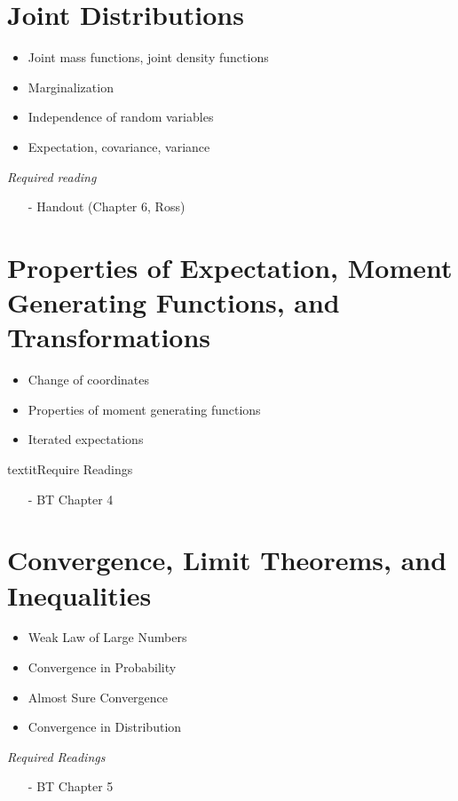 \documentclass{article}
\begin{document}
\section{Joint Distributions} 
\begin{itemize}
\item Joint mass functions, joint density functions
\item Marginalization
\item Independence of random variables
\item Expectation, covariance, variance
\end{itemize}
\textit{Required reading}
\begin{itemize}
\item[-] Handout (Chapter 6, Ross)
\end{itemize}

\section{Properties of Expectation, Moment Generating Functions, and Transformations}

\begin{itemize}
\item Change of coordinates
\item Properties of moment generating functions
\item Iterated expectations
\end{itemize}
textit{Require Readings}
\begin{itemize}
\item[-] BT Chapter 4
\end{itemize}






\section{Convergence, Limit Theorems, and Inequalities}

\begin{itemize}
\item Weak Law of Large Numbers
\item Convergence in Probability
\item Almost Sure Convergence
\item Convergence in Distribution
\end{itemize}
\textit{Required Readings}
\begin{itemize}
\item[-] BT Chapter 5
\end{itemize}
\end{document}
